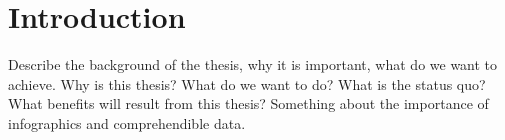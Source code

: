 \chapter{Introduction}
Describe the background of the thesis, why it is important, what do we want to achieve.
Why is this thesis? What do we want to do? What is the status quo? What benefits will result from this thesis?
Something about the importance of infographics and comprehendible data. 